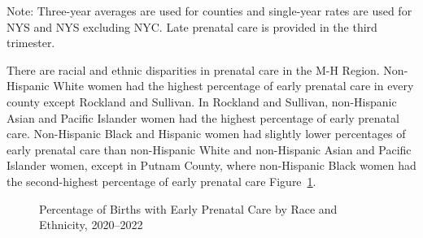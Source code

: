 \documentclass[
  english,
  letterpaper,
]{report}
\begin{document}
\begin{tcolorbox}[enhanced jigsaw, breakable, leftrule=.75mm, title=\textcolor{quarto-callout-note-color}{\faInfo}\hspace{0.5em}{Note}, bottomrule=.15mm, opacityback=0, left=2mm, colback=white, bottomtitle=1mm, coltitle=black, colbacktitle=quarto-callout-note-color!10!white, colframe=quarto-callout-note-color-frame, opacitybacktitle=0.6, toptitle=1mm, titlerule=0mm, arc=.35mm, rightrule=.15mm, toprule=.15mm]

Note: Three-year averages are used for counties and single-year rates
are used for NYS and NYS excluding NYC. Late prenatal care is provided
in the third trimester.

\end{tcolorbox}

There are racial and ethnic disparities in prenatal care in the M-H
Region. Non-Hispanic White women had the highest percentage of early
prenatal care in every county except Rockland and Sullivan. In Rockland
and Sullivan, non-Hispanic Asian and Pacific Islander women had the
highest percentage of early prenatal care. Non-Hispanic Black and
Hispanic women had slightly lower percentages of early prenatal care
than non-Hispanic White and non-Hispanic Asian and Pacific Islander
women, except in Putnam County, where non-Hispanic Black women had the
second-highest percentage of early prenatal care
Figure~\ref{fig-epc-rande-percent}.

\begin{figure}


\caption{\label{fig-epc-rande-percent}Percentage of Births with Early
Prenatal Care by Race and Ethnicity, 2020--2022}

\end{figure}%
\end{document}
